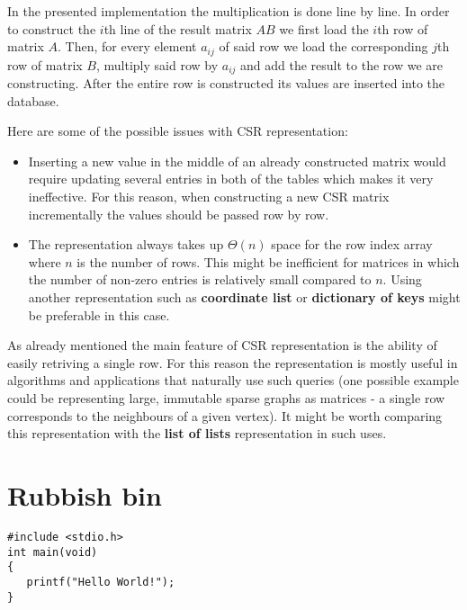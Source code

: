 \documentclass{article}
\begin{document}
In the presented implementation the multiplication is done line by line. In order to construct the $i$th line of the result matrix $AB$ we first load the $i$th row of matrix $A$. Then, for every element $a_{ij}$ of said row we load the corresponding $j$th row of matrix $B$, multiply said row by $a_{ij}$ and add the result to the row we are constructing. After the entire row is constructed its values are inserted into the database.

Here are some of the possible issues with CSR representation:
\begin{itemize}
\item Inserting a new value in the middle of an already constructed matrix would require updating several entries in both of the tables which makes it very ineffective. For this reason, when constructing a new CSR matrix incrementally the values should be passed row by row.

\item The representation always takes up $\Theta(n)$ space for the row index array where $n$ is the number of rows. This might be inefficient for matrices in which the number of non-zero entries is relatively small compared to $n$. Using another representation such as \textbf{coordinate list} or \textbf{dictionary of keys} might be preferable in this case.
\end{itemize}

As already mentioned the main feature of CSR representation is the ability of easily retriving a single row. For this reason the representation is mostly useful in algorithms and applications that naturally use such queries (one possible example could be representing large, immutable sparse graphs as matrices - a single row corresponds to the neighbours of a given vertex). It might be worth comparing this representation with the \textbf{list of lists} representation in such uses.


\pagebreak
\section*{Rubbish bin}

\begin{lstlisting}[style=CStyle]
#include <stdio.h>
int main(void)
{
   printf("Hello World!"); 
}
\end{lstlisting}
\end{document}
